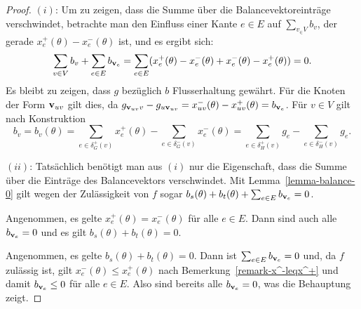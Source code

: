 \begin{proof}
	$(i)$: Um zu zeigen, dass die Summe über die Balancevektoreinträge verschwindet, betrachte man den Einfluss einer Kante $e\in E$ auf $\sum_{v_\in V} b_v$, der gerade $x_e^+(\theta) - x_e^-(\theta)$ ist, und es ergibt sich:
		$$\sum_{v\in V}b_v + \sum_{e\in E} b_{\mathbf{v}_e} = \sum_{e\in E}  (x_e^+(\theta) - x_e^-(\theta) + x_e^-(\theta) - x_e^+(\theta)) = 0.$$
		Es bleibt zu zeigen, dass $g$ bezüglich $b$ Flusserhaltung gewährt.
		Für die Knoten der Form $\mathbf{v}_{uv}$ gilt dies, da $g_{\mathbf{v}_{uv}v} - g_{u\mathbf{v}_{uv}} = x_{uv}^-(\theta) - x_{uv}^+(\theta) = b_{\mathbf{v}_e}$.
		Für $v\in V$ gilt nach Konstruktion $$b_v = b_v(\theta)=
		\sum_{e\in\delta^+_G(v)} x_{e}^+(\theta) - \sum_{e\in\delta^-_G(v)} x_{e}^-(\theta) =
	\sum_{e\in\delta_H^+(v)} g_e - \sum_{e\in\delta^-_H(v)}g_e
		.$$
	
	$(ii)$: Tatsächlich benötigt man aus $(i)$ nur die Eigenschaft, dass die Summe über die Einträge des Balancevektors verschwindet.
	Mit Lemma~\ref{lemma-balance-0} gilt wegen der Zulässigkeit von $f$ sogar $b_s(\theta)+b_t(\theta) + \sum_{e\in E} b_{\mathbf{v}_e} = 0$.
	
	Angenommen, es gelte $x_e^+(\theta) = x_e^-(\theta)$ für alle $e\in E$.
	Dann sind auch alle $b_{\mathbf{v}_e} = 0$ und es gilt $b_s(\theta) + b_t(\theta) = 0$.
	
	Angenommen, es gelte $b_s(\theta) + b_t(\theta) = 0$.
	Dann ist $\sum_{e\in E} b_{\mathbf{v}_e} = 0$ und, da $f$ zulässig ist, gilt $x_e^-(\theta)\leq x_e^+(\theta)$ nach Bemerkung~\ref{remark-x^-leqx^+}   und damit $b_{\mathbf{v}_e}\leq 0$ für alle $e\in E$.
	Also sind bereits alle $b_{\mathbf{v}_e} = 0$, was die Behauptung zeigt.
\end{proof}
